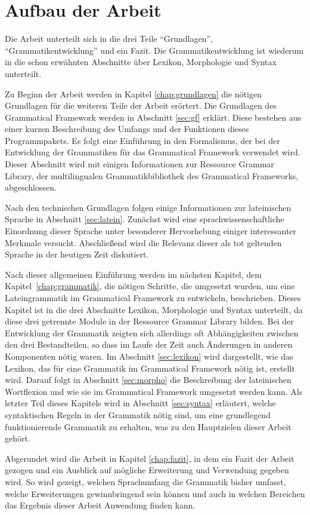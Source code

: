 \section{Aufbau der Arbeit}
\label{sec:aufbau}
Die Arbeit unterteilt sich in die drei Teile "`Grundlagen"', "`Grammatikentwicklung"' und ein Fazit. Die Grammatikentwicklung ist wiederum in die schon erwähnten Abschnitte über Lexikon, Morphologie und Syntax unterteilt. \par
Zu Beginn der Arbeit werden in Kapitel \ref{chap:grundlagen} die nötigen Grundlagen für die weiteren Teile der Arbeit erörtert. Die Grundlagen des Grammatical Framework werden in Abschnitt \ref{sec:gf} erklärt. Diese bestehen aus einer kurzen Beschreibung des Umfangs und der Funktionen dieses Programmpakets. Es folgt eine Einführung in den Formalismus, der bei der Entwicklung der Grammatiken für das Grammatical Framework verwendet wird. Dieser Abschnitt wird mit einigen Informationen zur Ressource Grammar Library, der multilingualen Grammatikbibliothek des Grammatical Frameworks, abgeschlossen. \par
Nach den technischen Grundlagen folgen einige Informationen zur lateinischen Sprache in Abschnitt \ref{sec:latein}. Zunächst wird eine sprachwissenschaftliche Einordnung dieser Sprache unter besonderer Hervorhebung einiger interessanter Merkmale versucht. Abschließend wird die Relevanz dieser als tot geltenden Sprache in der heutigen Zeit diskutiert. \par
Nach dieser allgemeinen Einführung werden im nächsten Kapitel, dem \mbox{Kapitel \ref{chap:grammatik}}, die nötigen Schritte, die umgesetzt wurden, um eine Lateingrammatik im Grammatical Framework zu entwickeln, beschrieben. Dieses Kapitel ist in die drei Abschnitte Lexikon, Morphologie und Syntax unterteilt, da diese drei getrennte Module in der Ressource Grammar Library bilden. Bei der Entwicklung der Grammatik zeigten sich allerdings oft Abhängigkeiten zwischen den drei Bestandteilen, so dass im Laufe der Zeit auch Änderungen in anderen Komponenten nötig waren. Im Abschnitt \ref{sec:lexikon} wird dargestellt, wie das Lexikon, das für eine Grammatik im Grammatical Framework nötig ist, erstellt wird. Darauf folgt in Abschnitt \ref{sec:morpho} die Beschreibung der lateinischen Wortflexion und wie sie im Grammatical Framework umgesetzt werden kann. Als letzter Teil dieses Kapitels wird in Abschnitt \ref{sec:syntax} erläutert, welche syntaktischen Regeln in der Grammatik nötig sind, um eine grundlegend funktionierende Grammatik zu erhalten, was zu den Hauptzielen dieser Arbeit gehört. \par
Abgerundet wird die Arbeit in Kapitel \ref{chap:fazit}, in dem ein Fazit der Arbeit gezogen und ein Ausblick auf mögliche Erweiterung und Verwendung gegeben wird. So wird gezeigt, welchen Sprachumfang die Grammatik bisher umfasst, welche Erweiterungen gewinnbringend sein können und auch in welchen Bereichen das Ergebnis dieser Arbeit Anwendung finden kann.
